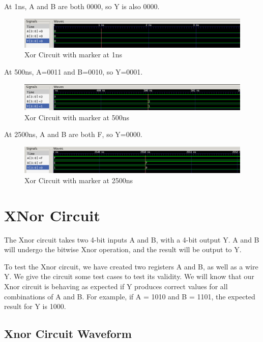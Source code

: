 \documentclass[12pt]{article}
\begin{document}
At 1ns, A and B are both 0000, so Y is also 0000.
\begin{figure}[H]
 \centering
 \includegraphics[width = 1.0\textwidth]{Xor/xor_wave.png}
 \caption{Xor Circuit with marker at 1ns}
 \label{fig:enter-label} 
\end{figure} 

At 500ns, A=0011 and B=0010, so Y=0001.
 \begin{figure}[H]
 \centering 
\includegraphics[width = 1.0\textwidth]{Xor/xor_wave1.png}
 \caption{Xor Circuit with marker at 500ns}
 \label{fig:enter-label}
 \end{figure}

At 2500ns, A and B are both F, so Y=0000.
 \begin{figure}[H]
 \centering 
\includegraphics[width = 1.0\textwidth]{Xor/xor_wave2.png}
 \caption{Xor Circuit with marker at 2500ns}
 \label{fig:enter-label}
 \end{figure}

 \section{XNor Circuit}
 The Xnor circuit takes two 4-bit inputs A and B, with a 4-bit output Y. A and B will undergo the bitwise Xnor operation, and the result will be output to Y.
  
 
 To test the Xnor circuit, we have created two registers A and B, as well as a wire Y. We give the circuit some test cases to test its validity. We will know that our Xnor circuit is behaving as expected if Y produces correct values for all combinations of A and B. For example, if A = 1010 and B = 1101, the expected result for Y is 1000.
 
 
 \subsection{Xnor Circuit Waveform} 
 
\end{document}
